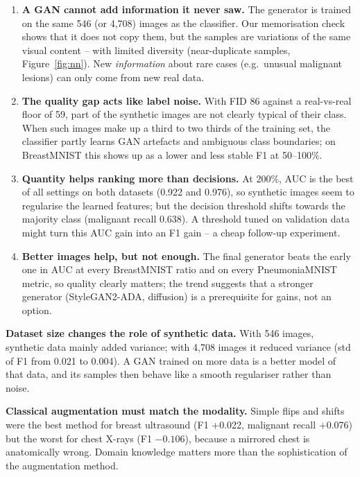 \begin{enumerate}
  \item \textbf{A GAN cannot add information it never saw.} The generator is trained on the same 546 (or 4{,}708)
        images as the classifier. Our memorisation check shows that it does not copy them, but the samples are
        variations of the same visual content -- with limited diversity (near-duplicate samples, Figure~\ref{fig:nn}).
        New \emph{information} about rare cases (e.g.\ unusual malignant lesions) can only come from new real data.
  \item \textbf{The quality gap acts like label noise.} With FID 86 against a real-vs-real floor of 59, part of the
        synthetic images are not clearly typical of their class. When such images make up a third to two thirds of the
        training set, the classifier partly learns GAN artefacts and ambiguous class boundaries; on BreastMNIST this
        shows up as a lower and less stable F1 at 50--100\%.
  \item \textbf{Quantity helps ranking more than decisions.} At 200\%, AUC is the best of all settings on both datasets
        (0.922 and 0.976), so synthetic images seem to regularise the learned features; but the decision threshold
        shifts towards the majority class (malignant recall 0.638). A threshold tuned on validation data might
        turn this AUC gain into an F1 gain -- a cheap follow-up experiment.
  \item \textbf{Better images help, but not enough.} The final generator beats the early one in AUC at every BreastMNIST
        ratio and on every PneumoniaMNIST metric, so quality clearly matters; the trend suggests that a stronger
        generator (StyleGAN2-ADA, diffusion) is a prerequisite for gains, not an option.
\end{enumerate}

\textbf{Dataset size changes the role of synthetic data.} With 546 images, synthetic data mainly added variance; with
4{,}708 images it reduced variance (std of F1 from 0.021 to 0.004). A GAN trained on more data is a better model of
that data, and its samples then behave like a smooth regulariser rather than noise.

\textbf{Classical augmentation must match the modality.} Simple flips and shifts were the best method for breast
ultrasound (F1 +0.022, malignant recall +0.076) but the worst for chest X-rays (F1 $-0.106$), because a mirrored chest is
anatomically wrong. Domain knowledge matters more than the sophistication of the augmentation method.

